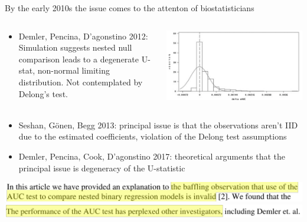 \documentclass{beamer}
\begin{document}
\begin{frame}
By the early 2010s the issue comes to the attenton of biostatisticians 

\vspace{.1in}
\begin{columns}
  \begin{column}{.5\textwidth}
\begin{itemize}
\item Demler, Pencina, D'agonstino 2012: Simulation suggests nested null comparison leads to a degenerate U-stat, non-normal limiting distribution. Not contemplated by Delong's test.
\end{itemize}
\end{column}
\begin{column}{.5\textwidth}
  \includegraphics[width=\textwidth]{histogram}
\end{column}
\end{columns}

\begin{itemize}
  \item Seshan, G\"onen, Begg 2013: principal issue is that the observations aren't IID due to the estimated coefficients, violation of the Delong test assumptions
  \end{itemize}
\end{frame}

\begin{frame}
  \begin{itemize}

\item Demler, Pencina, Cook, D'agonstino 2017: theoretical arguments
  that the principal issue is degeneracy of the U-statistic
  
\end{itemize}
\vspace{.2in}
\includegraphics[width=\textwidth]{seshan1}
\includegraphics[width=\textwidth]{seshan2}

\end{frame}
\end{document}
